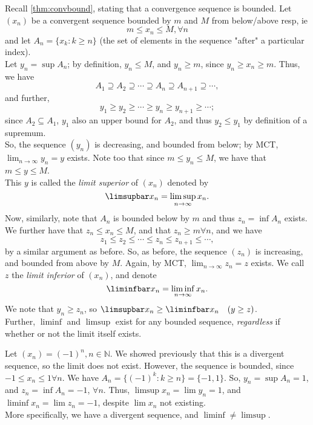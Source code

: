 \documentclass[12pt]{article}
\begin{document}
\begin{definition}
  Recall \cref{thm:convbound}, stating that a convergence sequence is bounded. Let $(x_n)$ be a convergent sequence bounded by $m$ and $M$ from below/above resp, ie 
  \[m \leq x_n \leq M, \forall n\]
  and let $A_n = \{x_k : k \geq n \}$ (the set of elements in the sequence "after" a particular index).\\ Let $y_n = \sup A_n$; by definition, $y_n \leq M$, and $y_n \geq m$, since $y_n \geq x_n \geq m$. Thus, we have \[A_1 \supseteq A_2 \supseteq \cdots \supseteq A_n \supseteq A_{n+1} \supseteq \cdots, \] and further, \[y_1 \geq y_2 \geq \cdots \geq y_n \geq y_{n+1} \geq \cdots;\] since $A_2 \subseteq A_1$, $y_1$ also an upper bound for $A_2$, and thus $y_2 \leq y_1$ by definition of a supremum. \\
  So, the sequence $(y_n)$ is decreasing, and bounded from below; by MCT, $\lim_{n\to\infty} y_n = y$ exists. Note too that since $m \leq y_n \leq M$, we have that $m \leq y \leq M$.\\
  This $y$ is called the \emph{limit superior} of $(x_n)$ denoted by \[\limsupbar x_n = \limsup_{n\to\infty}x_n.\]
  Now, similarly, note that $A_n$ is bounded below by $m$ and thus $z_n = \inf A_n$ exists. We further have that $z_n \leq x_n \leq M$, and that $z_n \geq m \forall n$, and we have \[z_1 \leq z_2 \leq \cdots \leq z_n \leq z_{n+1} \leq  \cdots, \] by a similar argument as before. So, as before, the sequence $(z_n)$ is increasing, and bounded from above by $M$. Again, by MCT, $\lim_{n\to\infty} z_n = z$ exists. We call $z$ the \emph{limit inferior} of $(x_n)$, and denote \[\liminfbar x_n = \liminf_{n\to\infty} x_n.\]
  We note that $y_n \geq z_n$, so $\limsupbar x_n \geq \liminfbar x_n\quad (y\geq z)$.\\
  Further, $\liminf$ and $\limsup$ exist for any bounded sequence, \textit{regardless} if whether or not the limit itself exists.
\end{definition}

\begin{example}
  Let $(x_n) = (-1)^n, n \in \mathbb{N}$. We showed previously that this is a divergent sequence, so the limit does not exist. However, the sequence is bounded, since $-1 \leq x_n \leq 1 \forall n$. We have $A_n = \{(-1)^k : k \geq n\} = \{-1, 1\}$. So, $y_n = \sup A_n = 1$, and $z_n = \inf A_n = -1$, $\forall n$. Thus, $\limsup x_n = \lim y_n = 1$, and $\liminf x_n = \lim z_n = -1$, despite $\lim x_n$ not existing.\\
  More specifically, we have a divergent sequence, and $\liminf \neq \limsup$.
\end{example}
\end{document}

